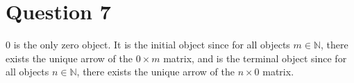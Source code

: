 \documentclass[11pt]{article} %
\theoremstyle{definition}
\begin{document}
\section*{Question 7}
\addtocounter{section}{1}
0 is the only zero object. 
It is the initial object since for all objects $m\in\mathbb{N}$,
there exists the unique arrow of the $0\times m$ matrix,
and is the terminal object since for all objects $n\in\mathbb{N}$,
there exists the unique arrow of the $n\times 0$ matrix.
\end{document}
